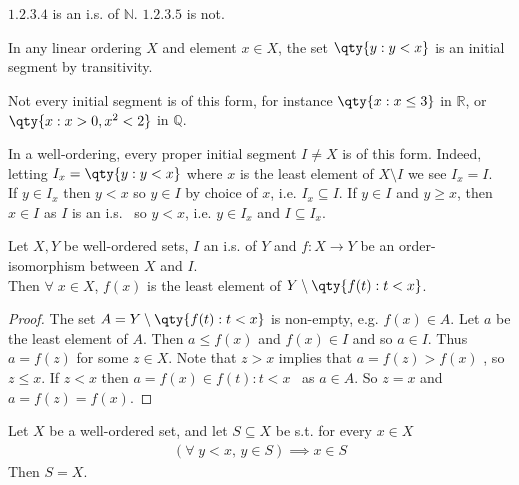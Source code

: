 \begin{example}
    $\qty{1, 2, 3, 4}$ is an i.s. of $\mathbb{N}$.
    $\qty{1, 2, 3, 5}$ is not.
\end{example}

\begin{remark}
    In any linear ordering $X$ and element $x \in X$, the set $\qty{y : y < x}$ is an initial segment by transitivity.

    Not every initial segment is of this form, for instance $\qty{x : x \leq 3}$ in $\mathbb R$, or $\qty{x : x > 0, x^2 < 2}$ in $\mathbb Q$.
\end{remark}

\begin{remark}
    In a well-ordering, every proper initial segment $I \neq X$ is of this form.
    Indeed, letting $I_x = \qty{y : y < x}$ where $x$ is the least element of $X \setminus I$ we see $I_x = I$. \\
    If $y \in I_x$ then $y < x$ so $y \in I$ by choice of $x$, i.e. $I_x \subseteq I$.
    If $y \in I$ and $y \geq x$, then $x \in I$ as $I$ is an i.s. \Lightning \ so $y < x$, i.e. $y \in I_x$ and $I \subseteq I_x$.
\end{remark}

\begin{lemma} \label{lem:1}
    Let $X, Y$ be well-ordered sets, $I$ an i.s. of $Y$ and $f : X \to Y$ be an order-isomorphism between $X$ and $I$. \\
    Then $\forall \; x \in X$, $f(x)$ is the least element of $Y \setminus \qty{f(t) : t < x}$.
\end{lemma}

\begin{proof}
    The set $A = Y \setminus \qty{f(t) : t < x}$ is non-empty, e.g. $f(x) \in A$.
    Let $a$ be the least element of $A$.
    Then $a \leq f(x)$ and $f(x) \in I$ and so $a \in I$.
    Thus $a = f(z)$ for some $z \in X$.
    Note that $z > x$ implies that $a = f(z) > f(x)$ \Lightning, so $z \leq x$.
    If $z < x$ then $a = f(x) \in {f(t) : t < x}$ \Lightning \ as $a \in A$.
    So $z = x$ and $a = f(z) = f(x)$.
\end{proof}

\begin{proposition}
    Let $X$ be a well-ordered set, and let $S \subseteq X$ be s.t. for every $x \in X$
    \begin{align*}
    (\forall \; y < x,\, y \in S) \implies x \in S
    \end{align*}
    Then $S = X$.
\end{proposition}

